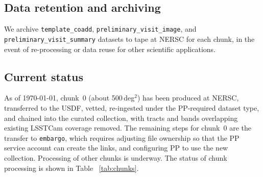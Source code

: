 \subsection{Data retention and archiving}
\label{sec:archiving}

We archive \texttt{template\_coadd}, \texttt{preliminary\_visit\_image}, and \texttt{preliminary\_visit\_summary} datasets to tape at NERSC for each chunk, in the event of re-processing or data reuse for other scientific applications.

\subsection{Current status}

As of \today, chunk~0 (about 500\,deg$^2$) has been produced at NERSC, transferred to the USDF, vetted, re-ingested under the PP-required dataset type, and chained into the curated collection, with tracts and bands overlapping existing LSSTCam coverage removed. The remaining steps for chunk~0 are the transfer to \texttt{embargo}, which requires adjusting file ownership so that the PP service account can create the links, and configuring PP to use the new collection. Processing of other chunks is underway. The status of chunk processing is shown in Table ~\ref{tab:chunks}.

